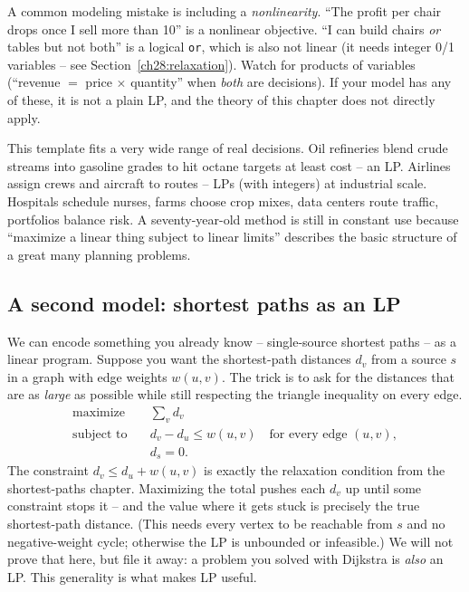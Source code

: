 \begin{trapbox}
A common modeling mistake is including a \emph{nonlinearity}. ``The profit per chair drops once I sell more than 10'' is a
nonlinear objective. ``I can build chairs \emph{or} tables but not both'' is a
logical \texttt{or}, which is also not linear (it needs integer 0/1 variables --
see Section~\ref{ch28:relaxation}). Watch for products of variables (``revenue
$=$ price $\times$ quantity'' when \emph{both} are decisions). If your
model has any of these, it is not a plain LP, and the
theory of this chapter does not directly apply.
\end{trapbox}

\begin{aestheticbox}
This template fits a very wide range of real decisions. Oil
refineries blend crude streams into gasoline grades to hit octane targets at
least cost -- an LP. Airlines assign crews and aircraft to routes -- LPs (with
integers) at industrial scale. Hospitals schedule nurses, farms choose crop
mixes, data centers route traffic, portfolios balance risk. A
seventy-year-old method is still in constant use because ``maximize a linear
thing subject to linear limits'' describes the basic structure of a great many
planning problems.
\end{aestheticbox}

\subsection{A second model: shortest paths as an LP}

We can encode something you already
know -- single-source shortest paths -- as a linear program. Suppose you want
the shortest-path distances $d_v$ from a source $s$ in a graph with edge
weights $w(u,v)$. The trick is to ask for the distances that are as
\emph{large} as possible while still respecting the triangle inequality on
every edge.
\[
\begin{aligned}
\text{maximize}\quad   & \sum_{v} d_v \\
\text{subject to}\quad & d_v - d_u \le w(u,v) \quad \text{for every edge }(u,v),\\
                       & d_s = 0.
\end{aligned}
\]
The constraint $d_v \le d_u + w(u,v)$ is exactly the relaxation condition from
the shortest-paths chapter. Maximizing the total pushes each $d_v$ up until
some constraint stops it -- and the value where it gets stuck is precisely the
true shortest-path distance. (This needs every vertex to be reachable from $s$
and no negative-weight cycle; otherwise the LP is unbounded or infeasible.) We
will not prove that here, but file it away: a
problem you solved with Dijkstra is \emph{also} an LP. This generality is what
makes LP useful.

